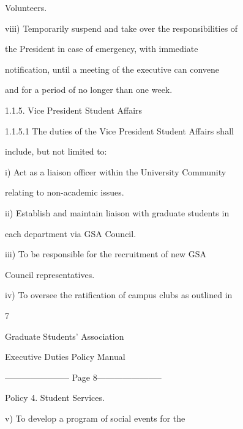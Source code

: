                   Volunteers.   

  

         viii)    Temporarily suspend and take over the responsibilities of  

                  the  President  in  case  of  emergency,  with  immediate  

                  notification, until a meeting of the executive can convene  

                  and for a period of no longer than one week.   

1.1.5. Vice President Student Affairs  

1.1.5.1           The  duties  of  the  Vice  President  Student  Affairs  shall  

         include, but not limited to:   

  

         i)       Act as a liaison officer within the University Community  

                  relating to non-academic issues.  

  

         ii)      Establish and maintain liaison with graduate students in  

                  each department via GSA Council.   

  

  

         iii)     To  be  responsible  for  the  recruitment  of  new  GSA  

                  Council representatives.   

  

         iv)      To oversee the ratification of campus clubs as outlined in  



                                                 7  

                                     

                                   Graduate Students’ Association  

                                  Executive Duties Policy Manual  

  


----------------------- Page 8-----------------------

                  Policy 4. Student Services.   

  

         v)       To     develop       a    program       of    social      events      for    the  


